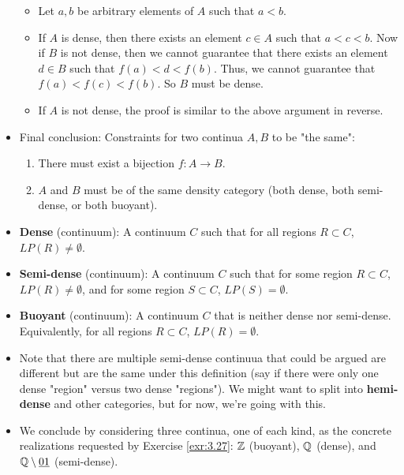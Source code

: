 \documentclass[titlepage]{report}
\begin{document}
\begin{itemize}
    \begin{itemize}
        \item Let $a,b$ be arbitrary elements of $A$ such that $a<b$.
        \item If $A$ is dense, then there exists an element $c\in A$ such that $a<c<b$. Now if $B$ is not dense, then we cannot guarantee that there exists an element $d\in B$ such that $f(a)<d<f(b)$. Thus, we cannot guarantee that $f(a)<f(c)<f(b)$. So $B$ must be dense.
        \item If $A$ is not dense, the proof is similar to the above argument in reverse.
    \end{itemize}
    \item Final conclusion: Constraints for two continua $A,B$ to be "the same":
    \begin{enumerate}
        \item There must exist a bijection $f:A\to B$.
        \item $A$ and $B$ must be of the same density category (both dense, both semi-dense, or both buoyant).
    \end{enumerate}
    \item \textbf{Dense} (continuum): A continuum $C$ such that for all regions $R\subset C$, $LP(R)\neq\emptyset$.
    \item \textbf{Semi-dense} (continuum): A continuum $C$ such that for some region $R\subset C$, $LP(R)\neq\emptyset$, and for some region $S\subset C$, $LP(S)=\emptyset$.
    \item \textbf{Buoyant} (continuum): A continuum $C$ that is neither dense nor semi-dense. Equivalently, for all regions $R\subset C$, $LP(R)=\emptyset$.
    \item Note that there are multiple semi-dense continuua that could be argued are different but are the same under this definition (say if there were only one dense "region" versus two dense "regions"). We might want to split into \textbf{hemi-dense} and other categories, but for now, we're going with this.
    \item We conclude by considering three continua, one of each kind, as the concrete realizations requested by Exercise \ref{exr:3.27}: $\Z$ (buoyant), $\Q$ (dense), and $\Q\setminus\underline{01}$ (semi-dense).
    \begin{figure}[h!]
        \centering
        \begin{subfigure}[b]{0.32\linewidth}
            \centering
            \begin{tikzpicture}
                \footnotesize

\end{tikzpicture}
\end{subfigure}
\end{figure}
\end{itemize}
\end{document}
